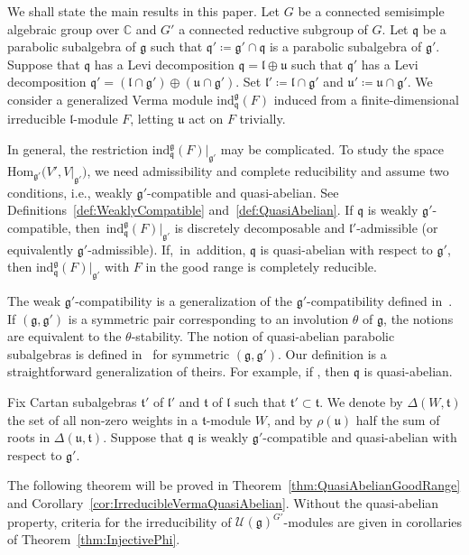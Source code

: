 \documentclass[pdftex]{sigma}
\numberwithin{equation}{section}
\theoremstyle{definition}
\newcommand{\Hom}{\mathrm{Hom}}
\newcommand{\BasicRing}[1]{\mathbb{#1}}
\newcommand{\CC}{\BasicRing{C}}
\newcommand{\lieC}[1]{\mathfrak{#1}}
\newcommand{\lie}[1]{\mathfrak{#1}}
\newcommand{\univ}[1]{\mathcal{U}(\lieC{#1})}
\newcommand{\ind}[2]{\mathrm{ind}^{\lieC{#1}}_{\lieC{#2}}}
\newcommand{\rhog}[1]{\rho(#1)}
\begin{document}
We shall state the main results in this paper.
Let $G$ be a connected semisimple algebraic group over $\CC$ and $G'$ a connected reductive subgroup of $G$.
Let $\lie{q}$ be a parabolic subalgebra of $\lie{g}$ such that $\lie{q'} \coloneq \lie{g'}\cap \lie{q}$ is a parabolic subalgebra of $\lie{g'}$.
Suppose that $\lie{q}$ has a Levi decomposition $\lie{q} = \lie{l}\oplus \lie{u}$ such that $\lie{q'}$ has a Levi decomposition $\lie{q'} = (\lie{l}\cap \lie{g'}) \oplus (\lie{u} \cap \lie{g'})$.
Set $\lie{l'}\coloneq \lie{l}\cap \lie{g'}$ and $\lie{u}'\coloneq \lie{u} \cap \lie{g'}$.
We consider a generalized Verma module $\ind{g}{q}(F)$ induced from a finite-dimensional irreducible $\lie{l}$-module $F$, letting $\lie{u}$ act on $F$ trivially.

In general, the restriction $\ind{g}{q}(F)|_{\lie{g'}}$ may be complicated.
To study the space $\Hom_{\lie{g'}}\bigl(V', V|_{\lie{g'}}\bigr)$, we need admissibility and complete reducibility
and assume two conditions, i.e., weakly $\lie{g'}$-compatible and quasi-abelian.
See Definitions~\ref{def:WeaklyCompatible} and~\ref{def:QuasiAbelian}.
If $\lie{q}$ is weakly $\lie{g'}$-compatible, then~$\ind{g}{q}(F)|_{\lie{g'}}$ is discretely decomposable and $\lie{l'}$-admissible (or equivalently $\lie{g'}$-admissible).
If,~in~addition, $\lie{q}$ is quasi-abelian with respect to $\lie{g'}$, then $\ind{g}{q}(F)|_{\lie{g'}}$ with $F$ in the good range is completely reducible.

The weak $\lie{g'}$-compatibility is a generalization of the $\lie{g'}$-compatibility defined in~\cite{Ko12_generalized_Verma}.
If $(\lie{g}, \lie{g'})$ is a symmetric pair corresponding to an involution $\theta$ of $\lie{g}$, the notions are equivalent to the $\theta$-stability.
The notion of quasi-abelian parabolic subalgebras is defined in~\cite[p.~109]{HMSW87} for symmetric $(\lie{g}, \lie{g'})$.
Our definition is a straightforward generalization of theirs.
For example, if \smash{${\bigl[\lie{u}\cap (\lie{g'})^\perp, \lie{u'}\bigr] = 0}$}, then $\lie{q}$ is quasi-abelian.

Fix Cartan subalgebras $\lie{t'}$ of $\lie{l'}$ and $\lie{t}$ of $\lie{l}$ such that $\lie{t'}\subset \lie{t}$.
We denote by $\Delta(W, \lie{t})$ the set of all non-zero weights in a $\lie{t}$-module $W$,
and by $\rhog{\lie{u}}$ half the sum of roots in $\Delta(\lie{u}, \lie{t})$.
Suppose that $\lie{q}$ is weakly $\lie{g'}$-compatible and quasi-abelian with respect to $\lie{g'}$.

The following theorem will be proved in Theorem~\ref{thm:QuasiAbelianGoodRange} and Corollary~\ref{cor:IrreducibleVermaQuasiAbelian}.
Without the quasi-abelian property, criteria for the irreducibility of $\univ{g}^{G'}$-modules are given in corollaries of Theorem~\ref{thm:InjectivePhi}.
\end{document}
